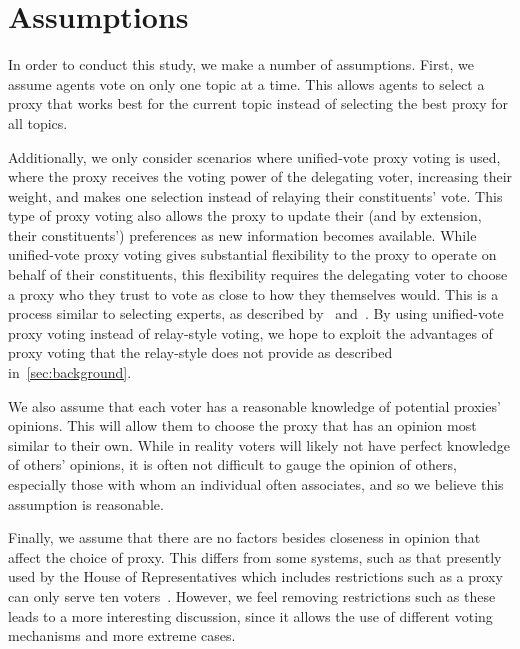 \section{Assumptions}\label{sec:assumptions}
In order to conduct this study, we make a number of assumptions.
First, we assume agents vote on only one
topic at a time.
This allows agents to select a proxy that works best for the current topic instead of
selecting the best proxy for all topics.

Additionally, we only consider scenarios where unified-vote proxy voting is used, where
the proxy receives the voting power of the delegating voter, increasing their weight,
and makes one selection instead of relaying their constituents' vote.
This type of proxy voting also allows the proxy to update their (and by extension, their
constituents') preferences as new information becomes available.
While unified-vote proxy voting gives substantial flexibility to the proxy to operate
on behalf of their constituents, this flexibility requires the delegating voter to
choose a proxy who they trust to vote as close to how they themselves would.
This is a process similar to selecting experts, as described by~\cite{Miller1969}
and~\cite{Mueller1972}.
By using unified-vote proxy voting instead of relay-style voting, we hope to exploit
the advantages of proxy voting that the relay-style does not provide as described
in~\autoref{sec:background}.

We also assume that each voter has a reasonable knowledge of potential proxies'
opinions.
This will allow them to choose the proxy that has an opinion most similar to their own.
While in reality voters will likely not have perfect knowledge of others' opinions,
it is often not difficult to gauge the opinion of others, especially
those with whom an individual often associates, and so we believe this assumption is
reasonable.

Finally, we assume that there are no factors besides closeness in opinion that affect
the choice of proxy.
This differs from some systems, such as that presently used by the House of
Representatives which includes restrictions such as a proxy can only serve ten
voters~\cite{CERP2020}.
However, we feel removing restrictions such as these leads to a more interesting
discussion, since it allows the use of different voting mechanisms and more extreme
cases.
